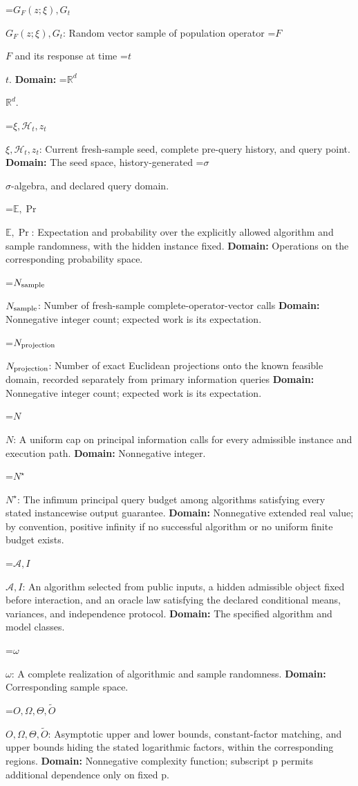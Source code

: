 \documentclass[10pt,a4paper]{article}
\newcommand{\AtlasMath}[1]{\par\begingroup\centering\setbox0=\hbox{$\displaystyle #1$}\ifdim\wd0>1.4\linewidth\typeout{ATLAS WIDE FORMULA: \the\wd0}\fi\ifdim\wd0>\linewidth\resizebox{\linewidth}{!}{\box0}\else\box0\fi\par\endgroup}
\newcommand{\AtlasInlineMath}[1]{\begingroup\setbox0=\hbox{$#1$}\ifdim\wd0>.4\linewidth\endgroup\AtlasMath{#1}\else\endgroup$#1$\fi}
\begin{document}
\AtlasInlineMath{G_F(z;\xi),G_t}: Random vector sample of population operator \AtlasInlineMath{F} and its response at time \AtlasInlineMath{t}. \textbf{Domain:} \AtlasInlineMath{\mathbb R^d}.

\AtlasInlineMath{\xi,\mathcal H_t,z_t}: Current fresh-sample seed, complete pre-query history, and query point. \textbf{Domain:} The seed space, history-generated \AtlasInlineMath{\sigma}-algebra, and declared query domain.

\AtlasInlineMath{\mathbb E,\Pr}: Expectation and probability over the explicitly allowed algorithm and sample randomness, with the hidden instance fixed. \textbf{Domain:} Operations on the corresponding probability space.

\AtlasInlineMath{N_{\rm sample}}: Number of fresh-sample complete-operator-vector calls \textbf{Domain:} Nonnegative integer count; expected work is its expectation.

\AtlasInlineMath{N_{\rm projection}}: Number of exact Euclidean projections onto the known feasible domain, recorded separately from primary information queries \textbf{Domain:} Nonnegative integer count; expected work is its expectation.

\AtlasInlineMath{N}: A uniform cap on principal information calls for every admissible instance and execution path. \textbf{Domain:} Nonnegative integer.

\AtlasInlineMath{N^\star}: The infimum principal query budget among algorithms satisfying every stated instancewise output guarantee. \textbf{Domain:} Nonnegative extended real value; by convention, positive infinity if no successful algorithm or no uniform finite budget exists.

\AtlasInlineMath{\mathcal A,I}: An algorithm selected from public inputs, a hidden admissible object fixed before interaction, and an oracle law satisfying the declared conditional means, variances, and independence protocol. \textbf{Domain:} The specified algorithm and model classes.

\AtlasInlineMath{\omega}: A complete realization of algorithmic and sample randomness. \textbf{Domain:} Corresponding sample space.

\AtlasInlineMath{O,\Omega,\Theta,\widetilde O}: Asymptotic upper and lower bounds, constant-factor matching, and upper bounds hiding the stated logarithmic factors, within the corresponding regions. \textbf{Domain:} Nonnegative complexity function; subscript p permits additional dependence only on fixed p.
\end{document}

